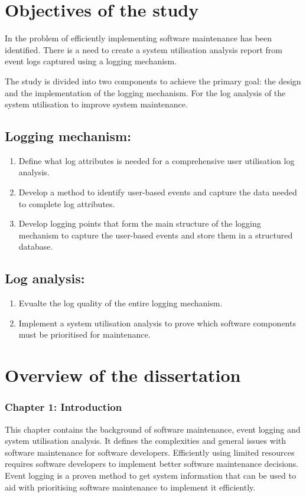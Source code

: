 \section{Objectives of the study}\label{sec:ch1_objectives}
In  the problem of efficiently implementing software maintenance has been identified. There is a need to create a system utilisation analysis report from event logs captured using a logging mechanism. \par The study is divided into two components to achieve the primary goal: the design and the implementation of the logging mechanism. For the log analysis of the system utilisation to improve system maintenance.

\subsection{Logging mechanism:}\label{sec:ch1_osLogging}
\begin{enumerate}
	\item Define what log attributes is needed for a comprehensive user utilisation log analysis.
	\item Develop a method to identify user-based events and capture the data needed to complete log attributes.
	\item Develop logging points that form the main structure of the logging mechanism to capture the user-based events and store them in a structured database.
\end{enumerate}

\subsection{Log analysis:}\label{sec:ch1_osAnalysis}
\begin{enumerate}
	\item Evualte the log quality of the entire logging mechanism.
	\item Implement a system utilisation analysis to prove which software components must be prioritised for maintenance.
\end{enumerate}

\section{Overview of the dissertation}
\subsubsection{Chapter 1: Introduction}
This chapter contains the background of software maintenance, event logging and system utilisation analysis. It defines the complexities and general issues with software maintenance for software developers. Efficiently using limited resources requires software developers to implement better software maintenance decisions. Event logging is a proven method to get system information that can be used to aid with prioritising software maintenance to implement it efficiently.

